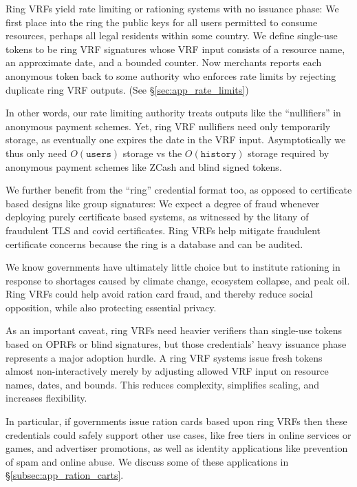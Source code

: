 Ring VRFs yield rate limiting or rationing systems with no issuance phase:\quad 
We first place into the ring the public keys for all users permitted to
consume resources, perhaps all legal residents within some country.  
We define single-use tokens to be ring VRF signatures whose VRF input
consists of a resource name, an approximate date, and a bounded counter.
Now merchants reports each anonymous token back to some authority who
enforces rate limits by rejecting duplicate ring VRF outputs.
(See \S\ref{sec:app_rate_limits})

In other words, our rate limiting authority treats outputs like the
``nullifiers'' in anonymous payment schemes.
Yet, ring VRF nullifiers need only temporarily storage, as eventually one
expires the date in the VRF input.  Asymptotically we thus only need
$O(\mathtt{users})$ storage vs the $O(\mathtt{history})$ storage
required by anonymous payment schemes like ZCash and blind signed tokens.

We further benefit from the ``ring'' credential format too,
 as opposed to certificate based designs like group signatures:\quad 
We expect a degree of fraud whenever deploying purely certificate
based systems, as witnessed by the litany of fraudulent TLS and covid
certificates.  Ring VRFs help mitigate fraudulent certificate concerns
because the ring is a database and can be audited.

We know governments have ultimately little choice but to institute
rationing in response to shortages caused by climate change, ecosystem
collapse, and peak oil.  Ring VRFs could help avoid ration card fraud,
and thereby reduce social opposition, while also protecting essential privacy.

As an important caveat, ring VRFs need heavier verifiers than single-use
tokens based on OPRFs \cite{PrivacyPass} or blind signatures, but
those credentials' heavy issuance phase represents a major adoption hurdle.
A ring VRF systems issue fresh tokens almost non-interactively merely by
adjusting allowed VRF input on resource names, dates, and bounds.
This reduces complexity, simplifies scaling, and increases flexibility.

In particular, if governments issue ration cards based upon ring VRFs
then these credentials could safely support other use cases, like
free tiers in online services or games, and advertiser promotions,
as well as identity applications like prevention of spam and online abuse. We discuss some of these 
applications in \S\ref{subsec:app_ration_carts}.

